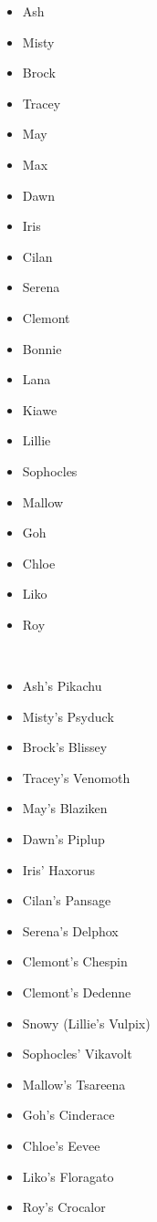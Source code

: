\documentclass[a4paper,12pt]{article}
\begin{document}
\begin{itemize}
\item Ash
\item Misty
\item Brock
\item Tracey
\item May
\item Max
\item Dawn
\item Iris
\item Cilan
\item Serena
\item Clemont
\item Bonnie
\item Lana
\item Kiawe
\item Lillie
\item Sophocles
\item Mallow
\item Goh
\item Chloe
\item Liko
\item Roy
\end{itemize}\\ \par \vspace{0.5cm}

\begin{itemize}
\item Ash's Pikachu
\item Misty's Psyduck
\item Brock's Blissey
\item Tracey's Venomoth
\item May's Blaziken
\item Dawn's Piplup
\item Iris' Haxorus
\item Cilan's Pansage
\item Serena's Delphox
\item Clemont's Chespin
\item Clemont's Dedenne
\item Snowy (Lillie's Vulpix)
\item Sophocles' Vikavolt
\item Mallow's Tsareena
\item Goh's Cinderace
\item Chloe's Eevee
\item Liko's Floragato
\item Roy's Crocalor
\end{itemize}\\ \par \vspace{0.5cm}
\end{document}
